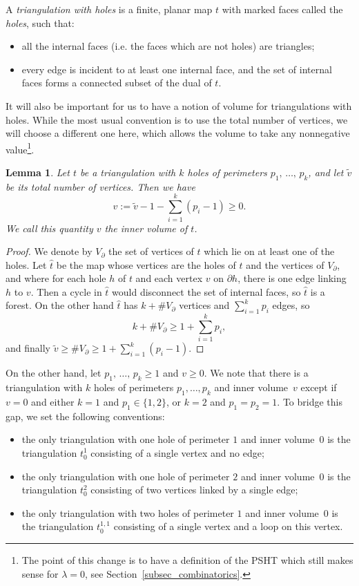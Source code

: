 \documentclass[10pt]{amsart}
\newtheorem{lemm}[theo]{Lemma}\newtheorem{prop}[theo]{Proposition}\newtheorem{coro}[theo]{Corollary}\newtheorem{conj}[theo]{Conjecture}
\theoremstyle{definition}\newtheorem{defi}[theo]{Definition}\newtheorem{rema}[theo]{Remark}\newtheorem{exam}[theo]{Example}\newtheorem{exem}[theo]{Example}\newtheorem{nota}[theo]{Notation}
\begin{document}
A \emph{triangulation with holes} is a finite, planar map $t$ with marked faces called the \emph{holes}, such that:
\begin{itemize}
\item all the internal faces (i.e. the faces which are not holes) are triangles;
\item every edge is incident to at least one internal face, and the set of internal faces forms a connected subset of the dual of $t$.
\end{itemize}
It will also be important for us to have a notion of volume for triangulations with holes. While the most usual convention is to use the total number of vertices, we will choose a different one here, which allows the volume to take any nonnegative value\footnote{The point of this change is to have a definition of the PSHT which still makes sense for $\lambda=0$, see Section~\ref{subsec_combinatorics}.}.

\begin{lemm}
Let $t$ be a triangulation with $k$ holes of perimeters $p_1,\, \dots,\, p_k$, and let $\widetilde{v}$ be its total number of vertices. Then we have
\begin{equation}\label{eqn_defn_inner_volume}
v := \widetilde{v}-1-\sum_{i=1}^k (p_i-1) \geq 0.
\end{equation}
We call this quantity $v$ the \emph{inner volume} of $t$.
\end{lemm}

\begin{proof}
We denote by $V_{\partial}$ the set of vertices of $t$ which lie on at least one of the holes. Let $\widehat{t}$ be the map whose vertices are the holes of $t$ and the vertices of $V_{\partial}$, and where for each hole $h$ of $t$ and each vertex $v$ on $\partial h$, there is one edge linking $h$ to $v$. Then a cycle in $\widehat{t}$ would disconnect the set of internal faces, so $\widehat{t}$ is a forest. On the other hand $\widehat{t}$ has $k+\# V_{\partial}$ vertices and $\sum_{i=1}^k p_i$ edges, so
\[
k+ \# V_{\partial} \geq 1+\sum_{i=1}^k p_i,
\]
and finally $\widetilde{v} \geq \# V_{\partial} \geq 1+\sum_{i=1}^k (p_i-1)$.
\end{proof}

On the other hand, let $p_1,\,\dots,\, p_k \geq 1$ and $v \geq 0$. We note that there is a triangulation with $k$ holes of perimeters $p_1, \dots, p_k$ and inner volume~$v$ except if $v=0$ and either $k=1$ and $p_1 \in \{1,2\}$, or $k=2$ and $p_1=p_2=1$. To bridge this gap, we set the following conventions:
\begin{itemize}
\item the only triangulation with one hole of perimeter $1$ and inner volume~$0$ is the triangulation $t^1_0$ consisting of a single vertex and no edge;
\item the only triangulation with one hole of perimeter $2$ and inner volume~$0$ is the triangulation $t^2_0$ consisting of two vertices linked by a single edge;
\item the only triangulation with two holes of perimeter $1$ and inner volume~$0$ is the triangulation $t^{1,1}_0$ consisting of a single vertex and a loop on this vertex.
\end{itemize}
\end{document}
